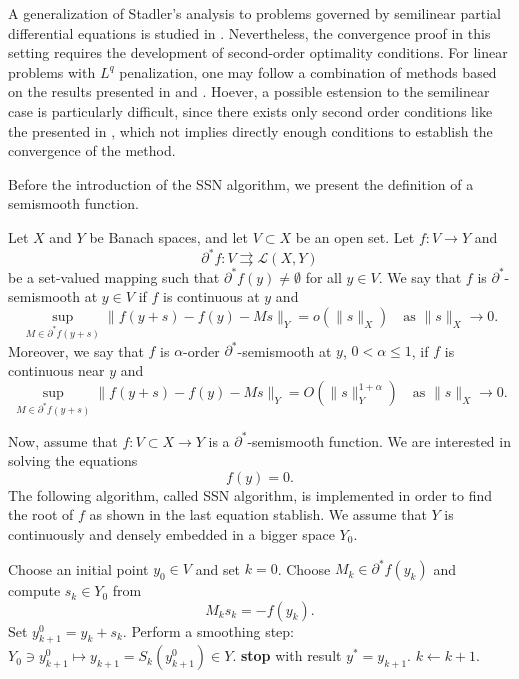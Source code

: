 A generalization of Stadler’s analysis to problems governed by semilinear partial differential equations 
is studied in \cite{casasmateos}. Nevertheless, the convergence proof in this setting requires the 
development of second-order optimality conditions. For linear problems with $L^q$ penalization, one may 
follow a combination of methods based on the results presented in \cite{stadler} and \cite{casasmateos}. 
Hoever, a possible estension to the semilinear case is particularly difficult, since there exists only
second order conditions like the presented in \cite{casas-wachsmuth}, which not implies directly enough 
conditions to establish the convergence of the method.

Before the introduction of the SSN algorithm, we present the definition of a semismooth function.

\begin{definition}\label{def:semismooth}
Let $X$ and $Y$ be Banach spaces, and let $V \subset X$ be an open set.
Let $f : V \to Y$ and
\[
\partial^* f : V \rightrightarrows \mathcal{L}(X,Y)
\]
be a set-valued mapping such that $\partial^* f(y) \neq \emptyset$ for all $y \in V$.
We say that $f$ is $\partial^*$-semismooth at $y \in V$ if $f$ is continuous at $y$ and
\[
\sup_{M \in \partial^* f(y+s)}
\| f(y+s) - f(y) - Ms \|_{Y}
= o(\|s\|_{X})
\quad \text{as } \|s\|_{X} \to 0.
\]
Moreover, we say that $f$ is $\alpha$-order $\partial^*$-semismooth at $y$, $0 < \alpha \le 1$,
if $f$ is continuous near $y$ and
\[
\sup_{M \in \partial^* f(y+s)}
\| f(y+s) - f(y) - Ms \|_{Y}
= O(\|s\|_{Y}^{1+\alpha})
\quad \text{as } \|s\|_{X} \to 0.
\]
\end{definition}

Now, assume that $f:V\subset X\to Y$ is a $\partial^*$-semismooth function. 
We are interested in solving the equations
\begin{equation}\label{eq:ssn_equation}
f(y)=0.
\end{equation}
The following algorithm, called SSN algorithm, is implemented in order to find the root of $f$ as 
shown in the last equation stablish. We assume that $Y$ is continuously
and densely embedded in a bigger space $Y_0$.

\begin{algorithm}[ht]
\caption{Semismooth Newton method}
\label{alg:ssn_ulbrich}
\begin{algorithmic}[1]
\State Choose an initial point $y_0 \in V$ and set $k = 0$.
\State Choose $M_k \in \partial^* f(y_k)$ and compute $s_k \in Y_0$ from
\[
M_k s_k = - f(y_k).
\]
\State Set $y_{k+1}^{0} = y_k + s_k$.
\State Perform a smoothing step: $Y_0 \ni y_{k+1}^{0} \mapsto y_{k+1} = S_k\!\left(y_{k+1}^{0}\right) \in Y$.
\State \textbf{stop} with result $y^* = y_{k+1}$.
\EndIf
\State $k \gets k+1$.
\EndWhile
\end{algorithmic}
\end{algorithm}

